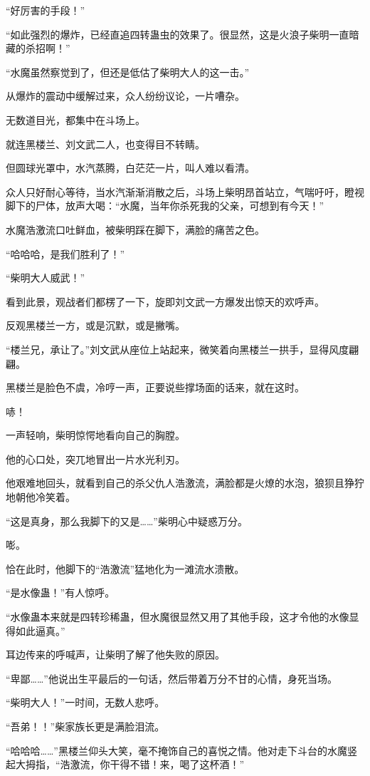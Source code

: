 \begin{this_body}
“好厉害的手段！”

“如此强烈的爆炸，已经直追四转蛊虫的效果了。很显然，这是火浪子柴明一直暗藏的杀招啊！”

“水魔虽然察觉到了，但还是低估了柴明大人的这一击。”

从爆炸的震动中缓解过来，众人纷纷议论，一片嘈杂。

无数道目光，都集中在斗场上。

就连黑楼兰、刘文武二人，也变得目不转睛。

但圆球光罩中，水汽蒸腾，白茫茫一片，叫人难以看清。

众人只好耐心等待，当水汽渐渐消散之后，斗场上柴明昂首站立，气喘吁吁，瞪视脚下的尸体，放声大喝：“水魔，当年你杀死我的父亲，可想到有今天！”

水魔浩激流口吐鲜血，被柴明踩在脚下，满脸的痛苦之色。

“哈哈哈，是我们胜利了！”

“柴明大人威武！”

看到此景，观战者们都楞了一下，旋即刘文武一方爆发出惊天的欢呼声。

反观黑楼兰一方，或是沉默，或是撇嘴。

“楼兰兄，承让了。”刘文武从座位上站起来，微笑着向黑楼兰一拱手，显得风度翩翩。

黑楼兰是脸色不虞，冷哼一声，正要说些撑场面的话来，就在这时。

哧！

一声轻响，柴明惊愕地看向自己的胸膛。

他的心口处，突兀地冒出一片水光利刃。

他艰难地回头，就看到自己的杀父仇人浩激流，满脸都是火燎的水泡，狼狈且狰狞地朝他冷笑着。

“这是真身，那么我脚下的又是……”柴明心中疑惑万分。

嘭。

恰在此时，他脚下的“浩激流”猛地化为一滩流水溃散。

“是水像蛊！”有人惊呼。

“水像蛊本来就是四转珍稀蛊，但水魔很显然又用了其他手段，这才令他的水像显得如此逼真。”

耳边传来的呼喊声，让柴明了解了他失败的原因。

“卑鄙……”他说出生平最后的一句话，然后带着万分不甘的心情，身死当场。

“柴明大人！”一时间，无数人悲呼。

“吾弟！！”柴家族长更是满脸泪流。

“哈哈哈……”黑楼兰仰头大笑，毫不掩饰自己的喜悦之情。他对走下斗台的水魔竖起大拇指，“浩激流，你干得不错！来，喝了这杯酒！”


\end{this_body}
